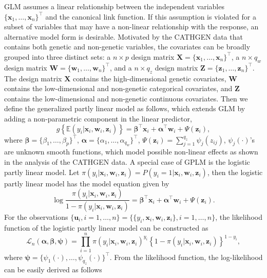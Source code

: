 \documentclass[11pt]{article}
\begin{document}
GLM assumes a linear relationship between the independent variables $\{\textbf{x}_1,\ldots,\textbf{x}_n\}^\top$ and the canonical link function. If this assumption is violated for a subset of variables that may have a non-linear relationship with the response, an alternative model form is desirable. Motivated by the CATHGEN data that contains both genetic and non-genetic variables, the covariates can be broadly grouped into three distinct sets: a $n \times p$ design matrix $\textbf{X}=\{\textbf{x}_1,\ldots,\textbf{x}_n\}^\top$, a $n \times q_w$ design matrix $\textbf{W} = \{\textbf{w}_1,\ldots,\textbf{w}_n \}^\top$, and a $n \times q_z$ design matrix $\textbf{Z} = \{\textbf{z}_1,\ldots,\textbf{z}_n \}^\top$. The design matrix $\textbf{X}$ contains the high-dimensional genetic covariates, $\textbf{W}$ contains the low-dimensional and non-genetic categorical covariates, and $\textbf{Z}$ contains the low-dimensional and non-genetic continuous covariates. Then we define the generalized partly linear model as follows, which extends GLM by adding a non-parametric component in the linear predictor,
$$
g\left\{\mathbb{E}(y_i | \textbf{x}_i, \textbf{w}_i, \textbf{z}_i)\right\} = \boldsymbol{\beta}^\top \textbf{x}_i + \boldsymbol{\alpha}^\top \textbf{w}_i + \Psi(\textbf{z}_i),
$$
where  $\boldsymbol{\beta} = \{\beta_1, \ldots, \beta_p \}^\top$, $\boldsymbol{\alpha}=\{\alpha_1, \ldots ,\alpha_{q_w} \}^\top$,  $\Psi(\textbf{z}_i) = \sum^{q_z}_{j=1} \psi_j(z_{ij})$, $\psi_j(\cdot)$'s are unknown smooth functions, which model possible non-linear effects as shown in the analysis of the CATHGEN data. A special case of GPLM is the logistic partly linear model. Let $\pi(y_i|\textbf{x}_i,\textbf{w}_i,\textbf{z}_i) = P(y_i = 1|\textbf{x}_i,\textbf{w}_i,\textbf{z}_i)$, then the logistic partly linear model has the model equation given by
$$
\log{\frac{\pi(y_i|\textbf{x}_i,\textbf{w}_i,\textbf{z}_i)}{1-\pi(y_i|\textbf{x}_i,\textbf{w}_i,\textbf{z}_i)}} = \boldsymbol{\beta}^\top \textbf{x}_i + \boldsymbol{\alpha}^\top \textbf{w}_i + \Psi(\textbf{z}_i).
$$
For the observations 
$\{\textbf{u}_i,i=1,\ldots,n\}= \{\{y_i, \textbf{x}_i, \textbf{w}_i, \textbf{z}_i\}, i=1,\ldots,n\}$, the likelihood function of the logistic partly linear model can be constructed as
$$
\mathcal{L}_n(\boldsymbol{\alpha}, \boldsymbol{\beta}, \boldsymbol{\psi}) = \prod^n_{i=1} \pi(y_i|\textbf{x}_i,\textbf{w}_i,\textbf{z}_i)^{y_i} \left\{1-\pi(y_i|\textbf{x}_i,\textbf{w}_i,\textbf{z}_i ) \right\}^{1-y_i},
$$
where $\boldsymbol{\psi}=\{\psi_1(\cdot),\ldots,\psi_{q_z}(\cdot) \}^\top$.
From the likelihood function, the log-likelihood can be easily derived as follows
\end{document}
